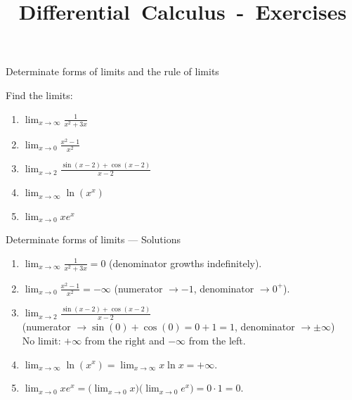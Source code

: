 \documentclass[9pt]{beamer}
\title{\huge \mbox{Differential Calculus - Exercises}}
\begin{document}
\maketitle

\begin{frame}{Determinate forms of limits and the rule of limits}

    Find the limits:

    \begin{enumerate}[leftmargin = 0.5cm, label = (\alph*), rightmargin = 0.2cm]
        
        \item $\lim_{x\rightarrow \infty}\frac{1}{x^2 + 3x}$

        \item $\lim_{x\rightarrow 0}\frac{x^2 - 1}{x^2}$

        \item $\lim_{x\rightarrow 2}\frac{\sin(x - 2) + \cos(x - 2)}{x - 2}$

        \item $\lim_{x\rightarrow \infty} \ln(x^x)$

        \item $\lim_{x\rightarrow 0} xe^x$

    \end{enumerate}
    
\end{frame}

\begin{frame}{Determinate forms of limits — Solutions}

\begin{enumerate}[leftmargin=0.5cm, label=(\alph*), rightmargin=0.2cm]

\item $\displaystyle \lim_{x\to\infty}\frac{1}{x^2+3x}=0$
\quad (denominator growths indefinitely).

\item $\displaystyle \lim_{x\to 0}\frac{x^2-1}{x^2}=-\infty$
\quad (numerator $\to -1$, denominator $\to 0^+$).

\item $\displaystyle \lim_{x\to 2}\frac{\sin(x-2)+\cos(x-2)}{x-2}$ \\
(numerator $\to \sin(0)+\cos(0) = 0 + 1 = 1$, denominator $\to \pm\infty$) \\
No limit: $+\infty$ from the right and $-\infty$ from the left.

\item $\displaystyle \lim_{x\to\infty}\ln(x^x)
=\lim_{x\to\infty}x\ln x=+\infty$.

\item $\displaystyle \lim_{x\to 0} x e^x
= \big(\lim_{x\to0}x\big)\big(\lim_{x\to0}e^x\big)=0\cdot 1=0$.

\end{enumerate}

\end{frame}
\end{document}
